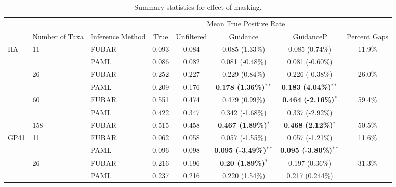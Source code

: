 \documentclass[11pt]{article}
\begin{document}

	

\newpage

\begin{table}[htbp]
\begin{adjustwidth}{-1.5cm}{}
\caption {\label{tab:summarystats} Summary statistics for effect of masking.}
\begin{tabular}{l l l c c c c c}
\hline\noalign{\smallskip}
& & & \multicolumn{4}{c}{Mean True Positive Rate} \\
\cline{4-7}\noalign{\smallskip}
\multicolumn{1}{c}{Selective Profile} & \multicolumn{1}{c}{Number of Taxa} & \multicolumn{1}{c}{Inference Method} & \multicolumn{1}{c}{True} & \multicolumn{1}{c}{Unfiltered} & \multicolumn{1}{c}{Guidance} & \multicolumn{1}{c}{GuidanceP} & \multicolumn{1}{c}{Percent Gaps} \\
\noalign{\smallskip}\hline\noalign{\smallskip}
HA  &  11  &  FUBAR  &  0.093  &  0.084  & 0.085 (1.33\%)  &  0.085 (0.74\%) & 11.9\% \\
  &    &  PAML  &  0.086  &  0.082  & 0.081 (-0.48\%)  &  0.081 (-0.60\%) &\\

 & 26 & FUBAR & 0.252 & 0.227 & 0.229 (0.84\%) & 0.226 (-0.38\%) & 26.0\%\\
 &   & PAML & 0.209 & 0.176 & \textbf{0.178 (1.36\%)$^{\ast\ast}$} & \textbf{0.183 (4.04\%)$^{\ast\ast}$} &\\

 & 60 & FUBAR & 0.551 & 0.474 & 0.479 (0.99\%) & \textbf{0.464 (-2.16\%)$^{\ast}$} & 59.4\%\\
 &  & PAML & 0.422 & 0.347 & 0.342 (-1.68\%) & 0.337 (-2.92\%) &\\

 & 158 & FUBAR & 0.515 & 0.458 & \textbf{0.467 (1.89\%)$^{\ast}$} & \textbf{0.468 (2.12\%)$^{\ast}$} & 50.5\%\\
\noalign{\smallskip}\hline\noalign{\smallskip}
GP41  &  11 &  FUBAR  &  0.062  &  0.058  &  0.057 (-1.55\%)  &  0.057 (-1.21\%) & 11.6\%\\
  &    &  PAML  &  0.096  &  0.098  & \textbf{0.095 (-3.49\%)$^{\ast\ast}$}  &  \textbf{0.095 (-3.80\%)$^{\ast\ast}$} &\\

 & 26 & FUBAR & 0.216 & 0.196 & \textbf{0.20 (1.89\%)$^{\ast}$} & 0.197 (0.36\%) & 31.3\%\\
 & & PAML & 0.237 & 0.216 & 0.220 (1.54\%) & 0.217 (0.244\%) &\\


\end{tabular}
\end{adjustwidth}
\end{table}
\end{document}
